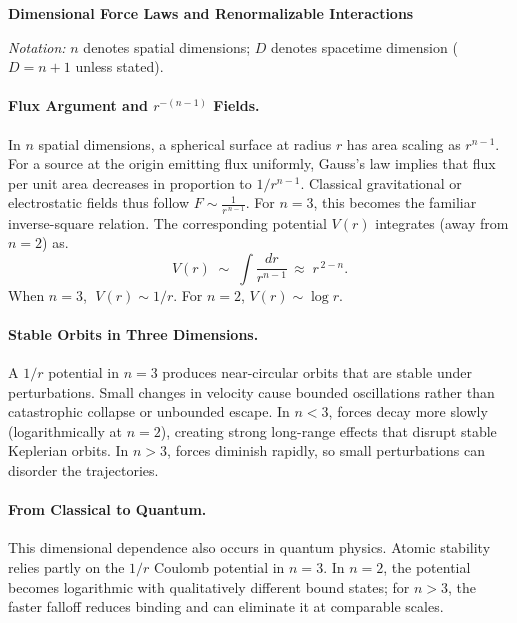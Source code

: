 \begin{technical}
    {\Large \textbf{Dimensional Force Laws and Renormalizable Interactions}}
    
    \noindent\emph{Notation:} $n$ denotes spatial dimensions; $D$ denotes spacetime dimension ($D=n+1$ unless stated).
    
    \paragraph{Flux Argument and $r^{-(n-1)}$ Fields.}
    In $n$ spatial dimensions, a spherical surface at radius $r$ has \QSOpen{}area\QSClose{} scaling as $r^{n-1}$. For a source at the origin emitting flux uniformly, Gauss's law implies that flux per unit area decreases in proportion to $1/r^{n-1}$. Classical gravitational or electrostatic fields thus follow  $F \sim \frac{1}{r^{\,n-1}}$.
    For $n=3$, this becomes the familiar inverse-square relation. The corresponding potential $V(r)$ integrates (away from $n=2$) as.
    $$
    V(r) \;\sim\; \int \frac{dr}{r^{n-1}} \,\approx\; r^{\,2-n}.
    $$
    When $n=3$, $\;V(r)\sim 1/r$. For $n=2$, $V(r)\sim \log r$.
    
    \paragraph{Stable Orbits in Three Dimensions.}
    A $1/r$ potential in $n=3$ produces near-circular orbits that are stable under perturbations. Small changes in velocity cause bounded oscillations rather than catastrophic collapse or unbounded escape. In $n<3$, forces decay more slowly (logarithmically at $n=2$), creating strong long-range effects that disrupt stable Keplerian orbits. In $n>3$, forces diminish rapidly, so small perturbations can disorder the trajectories.
    
    \paragraph{From Classical to Quantum.}
    This dimensional dependence also occurs in quantum physics. Atomic stability relies partly on the $1/r$ Coulomb potential in $n=3$. In $n=2$, the potential becomes logarithmic with qualitatively different bound states; for $n>3$, the faster falloff reduces binding and can eliminate it at comparable scales.
    

\end{technical}
